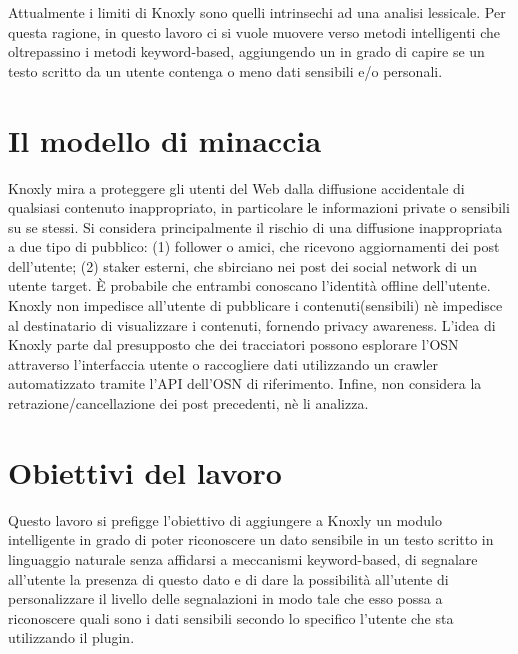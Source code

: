 Attualmente i limiti di Knoxly sono quelli intrinsechi ad una analisi lessicale. Per questa ragione, in questo lavoro ci si vuole muovere verso metodi intelligenti che oltrepassino i metodi keyword-based, aggiungendo un  in grado di capire se un testo scritto da un utente contenga o meno dati sensibili e/o personali.

\section{Il modello di minaccia}
Knoxly mira a proteggere gli utenti del Web dalla diffusione accidentale di qualsiasi contenuto inappropriato, in particolare le informazioni private o sensibili su se stessi. Si considera principalmente il rischio di una diffusione inappropriata a due tipo di pubblico: (1) follower o amici, che ricevono aggiornamenti dei post dell'utente; (2) staker esterni, che sbirciano nei post dei social network di un utente target. È probabile che entrambi conoscano l'identità offline dell'utente. Knoxly non impedisce all'utente di pubblicare i contenuti(sensibili) nè impedisce al destinatario di visualizzare i contenuti, fornendo privacy awareness. L'idea di Knoxly parte dal presupposto che dei tracciatori possono esplorare l'OSN attraverso l'interfaccia utente o raccogliere dati utilizzando un crawler automatizzato tramite l'API dell'OSN di riferimento. Infine, non considera la retrazione/cancellazione dei post precedenti, nè li analizza.

\section{Obiettivi del lavoro}
Questo lavoro si prefigge l'obiettivo di aggiungere a Knoxly un modulo intelligente in grado di poter riconoscere un dato sensibile in un testo scritto in linguaggio naturale senza affidarsi a meccanismi keyword-based, di segnalare all'utente la presenza di questo dato e di dare la possibilità all'utente di personalizzare il livello delle segnalazioni in modo tale che esso possa  a riconoscere quali sono i dati sensibili secondo lo specifico l'utente che sta utilizzando il plugin.

